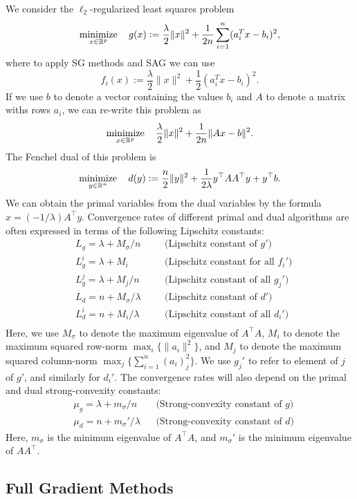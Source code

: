\documentclass{article}
\def\minim{\mathop{\hbox{minimize}}}
\def\minimize#1{\displaystyle\minim_{#1}}
\def\Real{\mathbb{R}}
\def\defd{\mathrel{\mathop:}=} %
\def\norm#1{\|#1\|}
\begin{document}
We consider the $\ell_2$-regularized least squares problem
\[
\minimize{x\in\Real^p} \quad g(x) \defd \frac{\lambda}{2}\norm{x}^2 + \frac{1}{2n}\sum_{i=1}^n(a_i^Tx - b_i)^2,
\]
where to apply SG methods and SAG we can use
\[
f_i(x) := \frac{\lambda}{2}\norm{x}^2 + \frac{1}{2}(a_i^Tx - b_i)^2.
\]
If we use $b$ to denote a vector containing the values $b_i$ and $A$ to denote a matrix withs rows $a_i$, we can re-write this problem as
\[
\minimize{x\in\Real^p} \quad \frac{\lambda}{2}\norm{x}^2 + \frac{1}{2n}\norm{Ax - b}^2.
\]
The Fenchel dual of this problem is
\[
\minimize{y\in\Real^n} \quad d(y) \defd \frac{n}{2}\norm{y}^2 + \frac{1}{2\lambda}y^\top AA^\top y + y^\top b.
\]
We can obtain the primal variables from the dual variables by the formula $x = (-1/\lambda)A^\top y$.
Convergence rates of different primal and dual algorithms are often expressed in terms of the following Lipschitz constants:
\begin{align*}
&L_g = \lambda + M_\sigma/n & & \textrm{(Lipschitz constant of $g'$)}\\
&L_g^i = \lambda + M_i \quad & & \textrm{(Lipschitz constant for all $f_i'$)}\\
&L_g^j = \lambda + M_j/n \quad & & \textrm{(Lipschitz constant of all $g_j'$)}\\
&L_d = n + M_\sigma/\lambda & & \textrm{(Lipschitz constant of $d'$)}\\
&L_d^i = n + M_i/\lambda \quad & & \textrm{(Lipschitz constant of all $d_i'$)}\\
\end{align*}
Here, we use $M_\sigma$ to denote the maximum eigenvalue of $A^\top A$, $M_i$ to denote the maximum squared row-norm $\max_i\{\norm{a_i}^2\}$, and $M_j$ to denote the maximum squared column-norm $\max_j\{\sum_{i=1}^n(a_i)^2_j\}$. We use $g_j'$ to refer to element of $j$ of $g'$, and similarly for $d_i'$. The convergence rates will also depend on the primal and dual strong-convexity constants:
\begin{align*}
&\mu_g = \lambda + m_\sigma/n & & \textrm{(Strong-convexity constant of $g$)}\\
&\mu_d = n + m_\sigma'/\lambda & & \textrm{(Strong-convexity constant of $d$)}
\end{align*}
Here, $m_\sigma$ is the minimum eigenvalue of $A^\top A$, and $m_\sigma'$ is the minimum eigenvalue of $AA^\top$.

\subsection{Full Gradient Methods}
\end{document}
